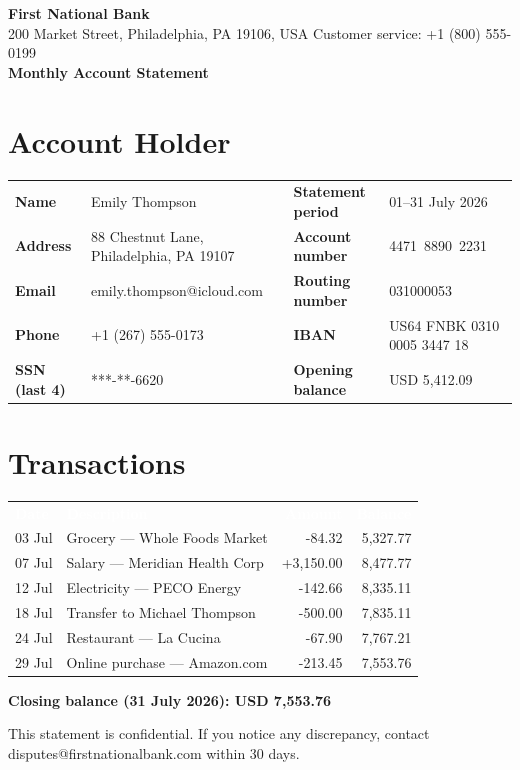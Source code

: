 \documentclass[11pt,a4paper]{article}
\begin{document}
{\Huge\bfseries\color{accent} First National Bank}\\[0.2em]
{\normalsize 200 Market Street, Philadelphia, PA 19106, USA \quad
Customer service: +1 (800) 555-0199}\\[0.8em]
{\LARGE\bfseries Monthly Account Statement}

\section{Account Holder}
\begin{tabularx}{\linewidth}{@{}>{\bfseries}l X >{\bfseries}l X@{}}
Name & Emily Thompson & Statement period & 01--31 July 2026 \\
Address & 88 Chestnut Lane, Philadelphia, PA 19107 & Account number & 4471~8890~2231 \\
Email & emily.thompson@icloud.com & Routing number & 031000053 \\
Phone & +1 (267) 555-0173 & IBAN & US64 FNBK 0310 0005 3447 18 \\
SSN (last 4) & ***-**-6620 & Opening balance & USD 5,412.09 \\
\end{tabularx}

\section{Transactions}
\begin{tabularx}{\linewidth}{@{}l X r r@{}}
\rowcolor{accent}\textcolor{white}{\textbf{Date}} & \textcolor{white}{\textbf{Description}} & \textcolor{white}{\textbf{Amount}} & \textcolor{white}{\textbf{Balance}} \\
03 Jul & Grocery — Whole Foods Market & -84.32 & 5,327.77 \\
\rowcolor{rowgray} 07 Jul & Salary — Meridian Health Corp & +3,150.00 & 8,477.77 \\
12 Jul & Electricity — PECO Energy & -142.66 & 8,335.11 \\
\rowcolor{rowgray} 18 Jul & Transfer to Michael Thompson & -500.00 & 7,835.11 \\
24 Jul & Restaurant — La Cucina & -67.90 & 7,767.21 \\
\rowcolor{rowgray} 29 Jul & Online purchase — Amazon.com & -213.45 & 7,553.76 \\
\end{tabularx}

\vspace{0.8em}
\textbf{Closing balance (31 July 2026): USD 7,553.76}

\vspace{1em}
{\small This statement is confidential. If you notice any discrepancy, contact
disputes@firstnationalbank.com within 30 days.}
\end{document}

